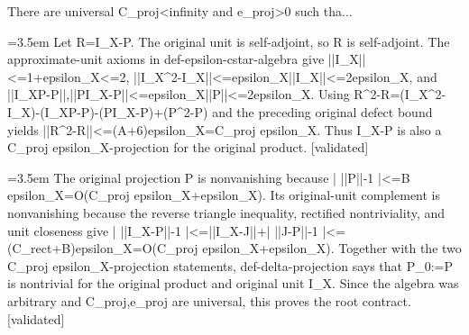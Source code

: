 \documentclass{article}
\newcommand{\step}[1]{\par\noindent\hangindent=3.5em\hangafter=1%
  \makebox[3.5em][l]{\textbf{#1.}}}
\newcommand{\steptag}[1]{\hfill{\small\textsf{[#1]}}}
\begin{document}
\begin{proofbox}{There are universal C\_proj<infinity and e\_proj>0 such tha...}
\step{1.5} Let R=I\_X-P. The original unit is self-adjoint, so R is self-adjoint. The approximate-unit axioms in def-epsilon-cstar-algebra give ||I\_X||<=1+epsilon\_X<=2, ||I\_X\textasciicircum{}2-I\_X||<=epsilon\_X||I\_X||<=2epsilon\_X, and ||I\_XP-P||,||PI\_X-P||<=epsilon\_X||P||<=2epsilon\_X. Using R\textasciicircum{}2-R=(I\_X\textasciicircum{}2-I\_X)-(I\_XP-P)-(PI\_X-P)+(P\textasciicircum{}2-P) and the preceding original defect bound yields ||R\textasciicircum{}2-R||<=(A+6)epsilon\_X=C\_proj epsilon\_X. Thus I\_X-P is also a C\_proj epsilon\_X-projection for the original product. \steptag{validated} \\[4pt]
\step{1.6} The original projection P is nonvanishing because | ||P||-1 |<=B epsilon\_X=O(C\_proj epsilon\_X+epsilon\_X). Its original-unit complement is nonvanishing because the reverse triangle inequality, rectified nontriviality, and unit closeness give | ||I\_X-P||-1 |<=||I\_X-J||+| ||J-P||-1 |<=(C\_rect+B)epsilon\_X=O(C\_proj epsilon\_X+epsilon\_X). Together with the two C\_proj epsilon\_X-projection statements, def-delta-projection says that P\_0:=P is nontrivial for the original product and original unit I\_X. Since the algebra was arbitrary and C\_proj,e\_proj are universal, this proves the root contract. \steptag{validated} \\[4pt]
\end{proofbox}
\end{document}

